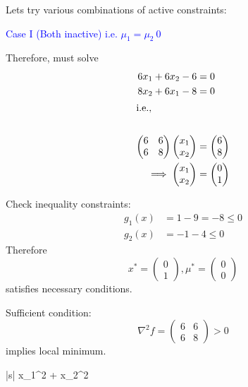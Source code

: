 \documentclass{article}
\begin{document}
	Lets try various combinations of active constraints:
	
			\textcolor{blue}{Case I  (Both inactive) 
			i.e. $\mu_1 = \mu_2 \ 0$}
			
			Therefore, must solve
			\begin{align*}
			  6x_1 + 6x_2 - 6 &= 0\\
			  8x_2 + 6x_1 - 8 &= 0\\
			\intertext{i.e.,}\\
			\begin{pmatrix}
			    6 & 6\\
			    6 & 8
			  \end{pmatrix}\begin{pmatrix}
			    x_1\\x_2
			  \end{pmatrix}&=\begin{pmatrix}
			    6\\8
			  \end{pmatrix}\\
			\implies 
			\begin{pmatrix}
			    x_1\\x_2
			  \end{pmatrix}&=\begin{pmatrix}
			    0\\1
			  \end{pmatrix}
			\end{align*}	

			Check inequality constraints:
			\begin{align*}
				g_1(x) &= 1 - 9 = -8 \leq 0 \\
				g_2(x) &= -1 - 4 \leq 0
			\end{align*}
			Therefore
			\[
				x^{\ast} = \begin{pmatrix}
			    			0\\1
			  			   \end{pmatrix}, 
			  	\mu^{\ast} = \begin{pmatrix}
			    				0\\0
			  			     \end{pmatrix}
			\]
			satisfies necessary conditions.
			
			Sufficient condition:
			\[ 
				\nabla^2 f 
					= \begin{pmatrix}
			    		6 & 6\\
			    		6 & 8
			  		  \end{pmatrix} > 0  
			\]	
			implies local minimum.		

\par{}
	\begin{mini*}|s|
		{}{x_1^2 + x_2^2}{}{}
	\end{mini*}
\end{document}
